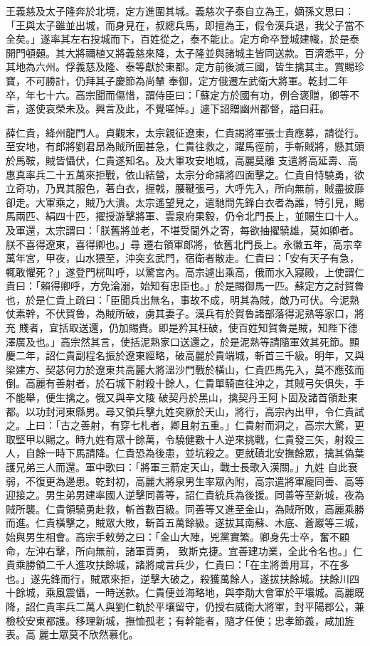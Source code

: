 \begin{pinyinscope}
 王義慈及太子隆奔於北境，定方進圍其城。義慈次子泰自立為王，嫡孫文思曰：「王與太子雖並出城，而身見在，叔總兵馬，即擅為王，假令漢兵退，我父子當不全矣。」遂率其左右投城而下，百姓從之，泰不能止。定方命卒登城建幟，於是泰開門頓顙。其大將禰植又將義慈來降，太子隆並與諸城主皆同送款。百濟悉平，分其地為六州。俘義慈及隆、泰等獻於東都。定方前後滅三國，皆生擒其主。賞賜珍寶，不可勝計，仍拜其子慶節為尚輦
 奉御，定方俄遷左武衛大將軍。乾封二年卒，年七十六。高宗聞而傷惜，謂侍臣曰：「蘇定方於國有功，例合褒贈，卿等不言，遂使哀榮未及。興言及此，不覺嗟悼。」遽下詔贈幽州都督，謚曰莊。



 薛仁貴，絳州龍門人。貞觀末，太宗親征遼東，仁貴謁將軍張士貴應募，請從行。至安地，有郎將劉君昂為賊所圍甚急，仁貴往救之，躍馬徑前，手斬賊將，懸其頭於馬鞍，賊皆懾伏，仁貴遂知名。及大軍攻安地城，高麗莫離
 支遣將高延壽、高惠真率兵二十五萬來拒戰，依山結營，太宗分命諸將四面擊之。仁貴自恃驍勇，欲立奇功，乃異其服色，著白衣，握戟，腰鞬張弓，大呼先入，所向無前，賊盡披靡卻走。大軍乘之，賊乃大潰。太宗遙望見之，遣馳問先鋒白衣者為誰，特引見，賜馬兩匹、絹四十匹，擢授游擊將軍、雲泉府果毅，仍令北門長上，並賜生口十人。及軍還，太宗謂曰：「朕舊將並老，不堪受閫外之寄，每欲抽擢驍雄，莫如卿者。朕不喜得遼東，喜得卿也。」尋
 遷右領軍郎將，依舊北門長上。永徽五年，高宗幸萬年宮，甲夜，山水猥至，沖突玄武門，宿衛者散走。仁貴曰：「安有天子有急，輒敢懼死？」遂登門桄叫呼，以驚宮內。高宗遽出乘高，俄而水入寢殿，上使謂仁貴曰：「賴得卿呼，方免淪溺，始知有忠臣也。」於是賜御馬一匹。蘇定方之討賀魯也，於是仁貴上疏曰：「臣聞兵出無名，事故不成，明其為賊，敵乃可伏。今泥熟仗素幹，不伏賀魯，為賊所破，虜其妻子。漢兵有於賀魯諸部落得泥熟等家口，將充
 賤者，宜括取送還，仍加賜賚。即是矜其枉破，使百姓知賀魯是賊，知陛下德澤廣及也。」高宗然其言，使括泥熟家口送還之，於是泥熟等請隨軍效其死節。顯慶二年，詔仁貴副程名振於遼東經略，破高麗於貴端城，斬首三千級。明年，又與梁建方、契苾何力於遼東共高麗大將溫沙門戰於橫山，仁貴匹馬先入，莫不應弦而倒。高麗有善射者，於石城下射殺十餘人，仁貴單騎直往沖之，其賊弓矢俱失，手不能舉，便生擒之。俄又與辛文陵
 破契丹於黑山，擒契丹王阿卜固及諸首領赴東都。以功封河東縣男。尋又領兵擊九姓突厥於天山，將行，高宗內出甲，令仁貴試之。上曰：「古之善射，有穿七札者，卿且射五重。」仁貴射而洞之，高宗大驚，更取堅甲以賜之。時九姓有眾十餘萬，令驍健數十人逆來挑戰，仁貴發三矢，射殺三人，自餘一時下馬請降。仁貴恐為後患，並坑殺之。更就磧北安撫餘眾，擒其偽葉護兄弟三人而還。軍中歌曰：「將軍三箭定天山，戰士長歌入漢關。」九姓
 自此衰弱，不復更為邊患。乾封初，高麗大將泉男生率眾內附，高宗遣將軍龐同善、高等迎接之。男生弟男建率國人逆擊同善等，詔仁貴統兵為後援。同善等至新城，夜為賊所襲。仁貴領驍勇赴救，斬首數百級。同善等又進至金山，為賊所敗，高麗乘勝而進。仁貴橫擊之，賊眾大敗，斬首五萬餘級。遂拔其南蘇、木底、蒼巖等三城，始與男生相會。高宗手敕勞之曰：「金山大陣，兇黨實繁。卿身先士卒，奮不顧命，左沖右擊，所向無前，諸軍賈勇，
 致斯克捷。宜善建功業，全此令名也。」仁貴乘勝領二千人進攻扶餘城，諸將咸言兵少，仁貴曰：「在主將善用耳，不在多也。」遂先鋒而行，賊眾來拒，逆擊大破之，殺獲萬餘人，遂拔扶餘城。扶餘川四十餘城，乘風震懾，一時送款。仁貴便並海略地，與李勣大會軍於平壤城。高麗既降，詔仁貴率兵二萬人與劉仁軌於平壤留守，仍授右威衛大將軍，封平陽郡公，兼檢校安東都護。移理新城，撫恤孤老；有幹能者，隨才任使；忠孝節義，咸加旌表。高
 麗士眾莫不欣然慕化。




\end{pinyinscope}
